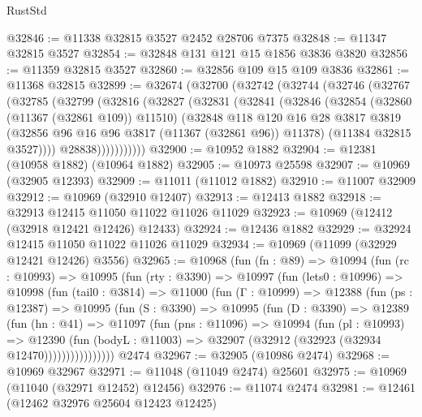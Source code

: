 \begin{lexlean}{RustStd}
\begin{coremodule}
@32846 := @11338 @32815 @3527 @2452 @28706 @7375
@32848 := @11347 @32815 @3527
@32854 := @32848 @131 @121 @15 @1856 @3836 @3820
@32856 := @11359 @32815 @3527
@32860 := @32856 @109 @15 @109 @3836
@32861 := @11368 @32815
@32899 := @32674
    (@32700
      (@32742
        (@32744
          (@32746
            (@32767
              (@32785
                (@32799
                  (@32816
                    (@32827
                      (@32831
                        (@32841
                          (@32846
                            (@32854
                              (@32860 (@11367 (@32861 @109)) @11510)
                              (@32848
                                @118
                                @120
                                @16
                                @28
                                @3817
                                @3819
                                (@32856 @96 @16 @96 @3817 (@11367 (@32861 @96)) @11378)
                                (@11384 @32815 @3527))))
                          @28838)))))))))))
@32900 := @10952 @1882
@32904 := @12381 (@10958 @1882) (@10964 @1882)
@32905 := @10973 @25598
@32907 := @10969 (@32905 @12393)
@32909 := @11011 (@11012 @1882)
@32910 := @11007 @32909
@32912 := @10969 (@32910 @12407)
@32913 := @12413 @1882
@32918 := @32913 @12415 @11050 @11022 @11026 @11029
@32923 := @10969 (@12412 (@32918 @12421 @12426) @12433)
@32924 := @12436 @1882
@32929 := @32924 @12415 @11050 @11022 @11026 @11029
@32934 := @10969 (@11099 (@32929 @12421 @12426) @3556)
@32965 := @10968
    (fun (fn : @89) =>
    @10994
      (fun (rc : @10993) =>
      @10995
        (fun (rty : @3390) =>
        @10997
          (fun (lets0 : @10996) =>
          @10998
            (fun (tail0 : @3814) =>
            @11000
              (fun (Γ : @10999) =>
              @12388
                (fun (ps : @12387) =>
                @10995
                  (fun (S : @3390) =>
                  @10995
                    (fun (D : @3390) =>
                    @12389
                      (fun (hn : @41) =>
                      @11097
                        (fun (pns : @11096) =>
                        @10994
                          (fun (pl : @10993) =>
                          @12390
                            (fun (bodyL : @11003) =>
                            @32907 (@32912 (@32923 (@32934 @12470))))))))))))))))
    @2474
@32967 := @32905 (@10986 @2474)
@32968 := @10969 @32967
@32971 := @11048 (@11049 @2474) @25601
@32975 := @10969 (@11040 (@32971 @12452) @12456)
@32976 := @11074 @2474
@32981 := @12461 (@12462 @32976 @25604 @12423 @12425)

\end{coremodule}
\end{lexlean}
